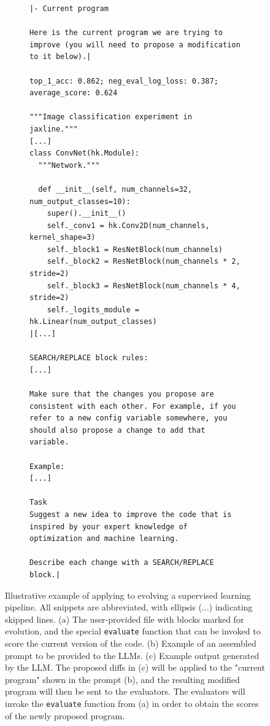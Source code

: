 \begin{figure}[htbp]
\begin{minipage}[c]{0.48\textwidth}
\begin{subfigure}{\textwidth}
\begin{verbatim}
|- Current program

Here is the current program we are trying to improve (you will need to propose a modification to it below).|

top_1_acc: 0.862; neg_eval_log_loss: 0.387; average_score: 0.624

"""Image classification experiment in jaxline."""
[...]
class ConvNet(hk.Module):
  """Network."""

  def __init__(self, num_channels=32, num_output_classes=10):
    super().__init__()
    self._conv1 = hk.Conv2D(num_channels, kernel_shape=3)
    self._block1 = ResNetBlock(num_channels)
    self._block2 = ResNetBlock(num_channels * 2, stride=2)
    self._block3 = ResNetBlock(num_channels * 4, stride=2)
    self._logits_module = hk.Linear(num_output_classes)
|[...]

SEARCH/REPLACE block rules:
[...]

Make sure that the changes you propose are consistent with each other. For example, if you refer to a new config variable somewhere, you should also propose a change to add that variable.

Example:
[...]

Task
Suggest a new idea to improve the code that is inspired by your expert knowledge of optimization and machine learning.  

Describe each change with a SEARCH/REPLACE block.|
\end{verbatim}
            \addtocounter{subfigure}{-2}
            \captionsetup{justification=centering, singlelinecheck=false}
            \caption{}
            \label{fig:grounding-prompt}
        \end{subfigure}
    \end{minipage}
    \caption{Illustrative example of applying \method to evolving a supervised learning pipeline. All snippets are abbreviated, with ellipsis (...) indicating skipped lines. (a) The user-provided file with blocks marked for evolution, and the special \texttt{evaluate} function that can be invoked to score the current version of the code. (b) Example of an assembled prompt to be provided to the LLMs. (c) Example output generated by the LLM. The proposed diffs in (c) will be applied to the "current program" shown in the prompt (b), and the resulting modified program will then be sent to the evaluators. The evaluators will invoke the \texttt{evaluate} function from (a) in order to obtain the scores of the newly proposed program.}
    \label{fig:grounding}
\end{figure}